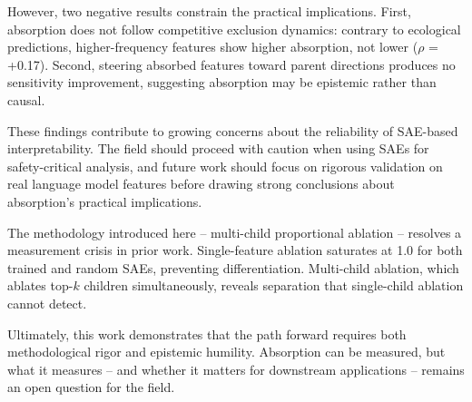 \documentclass{article}
\begin{document}
However, two negative results constrain the practical implications. First, absorption does not follow competitive exclusion dynamics: contrary to ecological predictions, higher-frequency features show higher absorption, not lower ($\rho$ = +0.17). Second, steering absorbed features toward parent directions produces no sensitivity improvement, suggesting absorption may be epistemic rather than causal.

These findings contribute to growing concerns about the reliability of SAE-based interpretability. The field should proceed with caution when using SAEs for safety-critical analysis, and future work should focus on rigorous validation on real language model features before drawing strong conclusions about absorption's practical implications.

The methodology introduced here -- multi-child proportional ablation -- resolves a measurement crisis in prior work. Single-feature ablation saturates at 1.0 for both trained and random SAEs, preventing differentiation. Multi-child ablation, which ablates top-$k$ children simultaneously, reveals separation that single-child ablation cannot detect.

Ultimately, this work demonstrates that the path forward requires both methodological rigor and epistemic humility. Absorption can be measured, but what it measures -- and whether it matters for downstream applications -- remains an open question for the field.




\end{document}
